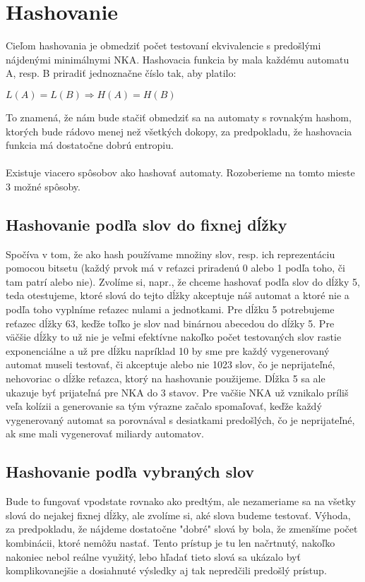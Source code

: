 \section{Hashovanie}
Cieľom hashovania je obmedziť počet testovaní ekvivalencie s predošlými nájdenými minimálnymi NKA. Hashovacia funkcia by mala každému automatu A, resp. B priradiť jednoznačne číslo tak, aby platilo:
\\
\centerline{$L(A) = L(B) \Rightarrow H(A) = H(B)$}
To znamená, že nám bude stačiť obmedziť sa na automaty s rovnakým hashom, ktorých bude rádovo menej než všetkých dokopy, za predpokladu, že hashovacia funkcia má dostatočne dobrú entropiu.

\paragraph{}
Existuje viacero spôsobov ako hashovať automaty. Rozoberieme na tomto mieste 3 možné spôsoby.


\label{hashSlova}
\subsection{Hashovanie podľa slov do fixnej dĺžky}
Spočíva v tom, že ako hash používame množiny slov, resp. ich reprezentáciu pomocou bitsetu (každý prvok má v reťazci priradenú 0 alebo 1 podľa toho, či tam patrí alebo nie). Zvolíme si, napr., že chceme hashovať podľa slov do dĺžky 5, teda otestujeme, ktoré slová do tejto dĺžky akceptuje náš automat a ktoré nie a podľa toho vyplníme reťazec nulami a jednotkami. Pre dĺžku 5 potrebujeme reťazec dĺžky 63, keďže toľko je slov nad binárnou abecedou do dĺžky 5. Pre väčšie dĺžky to už nie je veľmi efektívne nakoľko počet testovaných slov rastie exponenciálne a už pre dĺžku napríklad 10 by sme pre každý vygenerovaný automat museli testovať, či akceptuje alebo nie 1023 slov, čo je neprijateľné, nehovoriac o dĺžke reťazca, ktorý na hashovanie použijeme. Dĺžka 5 sa ale ukazuje byť prijateľná pre NKA do 3 stavov. Pre vačšie NKA už vznikalo príliš veľa kolízii a generovanie sa tým výrazne začalo spomaľovať, keďže každý vygenerovaný automat sa porovnával s desiatkami predošlých, čo je neprijateľné, ak sme mali vygenerovať miliardy automatov.

\subsection{Hashovanie podľa vybraných slov}
Bude to fungovať vpodstate rovnako ako predtým, ale nezameriame sa na všetky slová do nejakej fixnej dĺžky, ale zvolíme si, aké slova budeme testovať. Výhoda, za predpokladu, že nájdeme dostatočne "dobré" slová by bola, že zmenšíme počet kombinácii, ktoré nemôžu nastať. Tento prístup je tu len načrtnutý, nakoľko nakoniec nebol reálne využitý, lebo hľadať tieto slová sa ukázalo byť komplikovanejšie a dosiahnuté výsledky aj tak nepredčili predošlý prístup.

